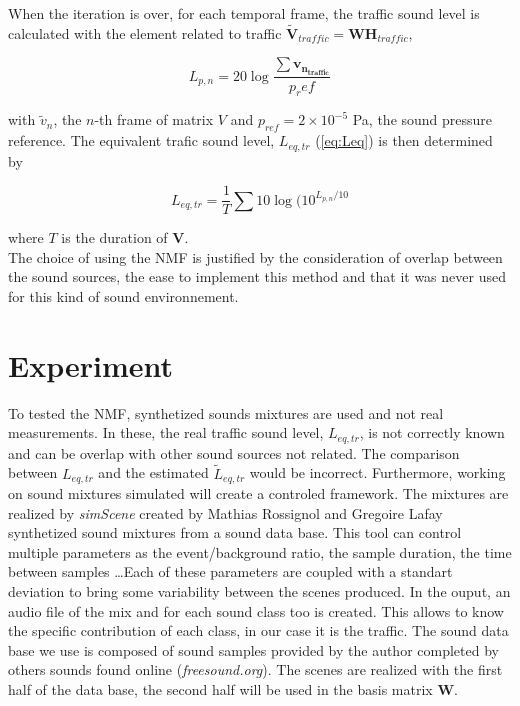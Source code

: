 \documentclass{article}
\begin{document}
\begin{sloppy}
When the iteration is over, for each temporal frame, the traffic sound level is calculated with the element related to traffic $\mathbf{\tilde{V}}_{traffic} = \mathbf{WH}_{traffic}$,

\begin{equation}
L_{p,n} = 20\log\frac{\sum\mathbf{v_{n_{traffic}}}}{p_ref}
\end{equation}

with $\tilde{v}_n$, the $n$-th frame of matrix $V$ and $ p_{ref} = 2\times 10^{-5}$ Pa, the sound pressure reference. The equivalent trafic sound level, $L_{eq,tr}$ (\ref{eq:Leq}) is then determined by

\begin{equation}
L_{eq,tr} = \frac{1}{T} \sum 10\log (10^{L_{p,n}/10}
\end{equation}

where $T$ is the duration of $\mathbf{V}$.\\

The choice of using the NMF is justified by the consideration of overlap between the sound sources, the ease to implement this method and that it was never used for this kind of sound environnement.

\section{Experiment}

To tested the NMF, synthetized sounds mixtures are used and not real measurements. In these, the real traffic sound level, $L_{eq,tr}$, is not correctly known and can be overlap with other sound sources not related. The comparison between $L_{eq,tr}$ and the estimated $\tilde{L}_{eq,tr}$ would be incorrect. Furthermore, working on sound mixtures simulated will create a controled framework.
The mixtures are realized by \textit{simScene} created by Mathias Rossignol and Gregoire Lafay \cite{simScene} synthetized sound mixtures from a sound data base. This tool can control multiple parameters as the event/background ratio, the sample duration, the time between samples \dots Each of these parameters are coupled with a standart deviation to bring some variability between the scenes produced. In the ouput, an audio file of the mix and for each sound class too is created. This allows to know the specific contribution of each class, in our case it is the traffic. The sound data base we use is composed of sound samples provided by the author completed by others sounds found online (\textit{freesound.org}). The scenes are realized with the first half of the data base, the second half will be used in the basis matrix $\mathbf{W}$.\\


\end{sloppy}
\end{document}
